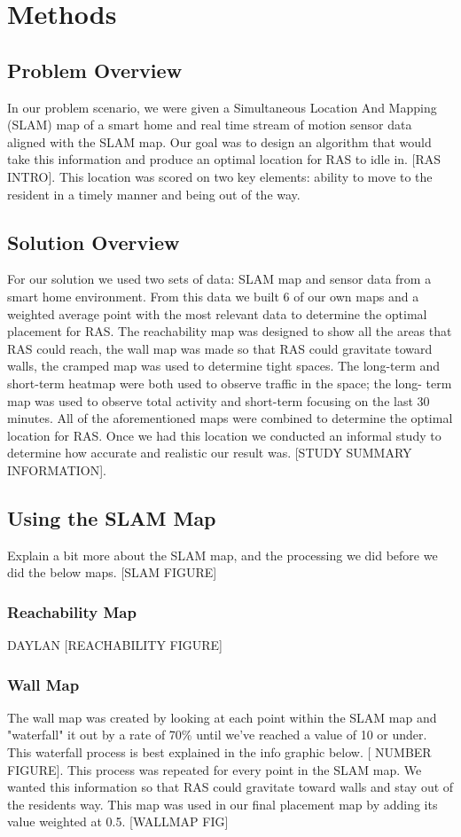 \documentclass[11pt, draft, a4paper]{IEEEtran}
\begin{document}
\section{Methods}


\subsection{Problem Overview}
In our problem scenario, we were given a Simultaneous Location And Mapping 
(SLAM) map of a smart home and real time stream of motion sensor data aligned 
with the SLAM map. Our goal was to design an algorithm that would  take this 
information and produce an optimal location for RAS to idle in. [RAS INTRO]. 
This location was scored on two key elements: ability to move to the resident 
in a timely manner and being out of the way. 


\subsection{Solution Overview}
For our solution we used two sets of data: SLAM map and sensor data from a 
smart home environment. From this data we built 6 of our own maps and a 
weighted average point with the most relevant data to determine the optimal 
placement for RAS. The reachability map was designed to show all the areas 
that RAS could reach, the wall map was made so that RAS could gravitate toward 
walls, the cramped map was used to determine tight spaces. The long-term and 
short-term heatmap were both used to observe traffic in the space; the long-
term map was used to observe total activity and short-term focusing on the 
last 30 minutes. All of the aforementioned maps were combined to determine the 
optimal location for RAS. Once we had this location we conducted an informal 
study to determine how accurate and realistic our result was. [STUDY SUMMARY 
INFORMATION].


\subsection{Using the SLAM Map}
Explain a bit more about the SLAM map, and the processing we did before we did 
the below maps.
[SLAM FIGURE]

\subsubsection{Reachability Map}
DAYLAN
[REACHABILITY FIGURE]


\subsubsection{Wall Map}
The wall map was created by looking at each point within the SLAM map and 
"waterfall" it out by a rate of 70\% until we've reached a value of 10 or 
under. This waterfall process is best explained in the info graphic below. [
NUMBER FIGURE]. This process was repeated for every point in the SLAM map. We 
wanted this information so that RAS could gravitate toward walls and stay out 
of the residents way. This map was used in our final placement map by adding 
its value weighted at 0.5. [WALLMAP FIG]
\end{document}

